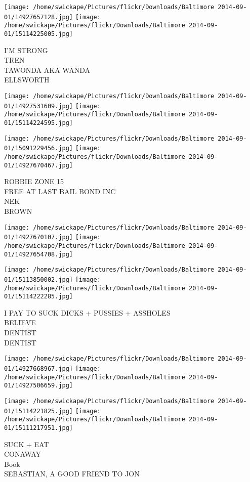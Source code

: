 \documentclass[10pt,letterpaper]{article}
\begin{document}
\texttt{[image: /home/swickape/Pictures/flickr/Downloads/Baltimore 2014-09-01/14927657128.jpg]}
\texttt{[image: /home/swickape/Pictures/flickr/Downloads/Baltimore 2014-09-01/15114225005.jpg]}

I'M STRONG\\
TREN\\
TAWONDA AKA WANDA\\
ELLSWORTH
\pagebreak

\texttt{[image: /home/swickape/Pictures/flickr/Downloads/Baltimore 2014-09-01/14927531609.jpg]}
\texttt{[image: /home/swickape/Pictures/flickr/Downloads/Baltimore 2014-09-01/15114224595.jpg]}

\texttt{[image: /home/swickape/Pictures/flickr/Downloads/Baltimore 2014-09-01/15091229456.jpg]}
\texttt{[image: /home/swickape/Pictures/flickr/Downloads/Baltimore 2014-09-01/14927670467.jpg]}

ROBBIE ZONE 15\\
FREE AT LAST BAIL BOND INC\\
NEK\\
BROWN
\pagebreak

\texttt{[image: /home/swickape/Pictures/flickr/Downloads/Baltimore 2014-09-01/14927670107.jpg]}
\texttt{[image: /home/swickape/Pictures/flickr/Downloads/Baltimore 2014-09-01/14927654708.jpg]}

\texttt{[image: /home/swickape/Pictures/flickr/Downloads/Baltimore 2014-09-01/15113850002.jpg]}
\texttt{[image: /home/swickape/Pictures/flickr/Downloads/Baltimore 2014-09-01/15114222285.jpg]}

I PAY TO SUCK DICKS + PUSSIES + ASSHOLES\\
BELIEVE\\
DENTIST\\
DENTIST
\pagebreak

\texttt{[image: /home/swickape/Pictures/flickr/Downloads/Baltimore 2014-09-01/14927668967.jpg]}
\texttt{[image: /home/swickape/Pictures/flickr/Downloads/Baltimore 2014-09-01/14927506659.jpg]}

\texttt{[image: /home/swickape/Pictures/flickr/Downloads/Baltimore 2014-09-01/15114221825.jpg]}
\texttt{[image: /home/swickape/Pictures/flickr/Downloads/Baltimore 2014-09-01/15111217951.jpg]}

SUCK + EAT\\
CONAWAY\\
Book\\
SEBASTIAN, A GOOD FRIEND TO JON
\pagebreak
\end{document}
